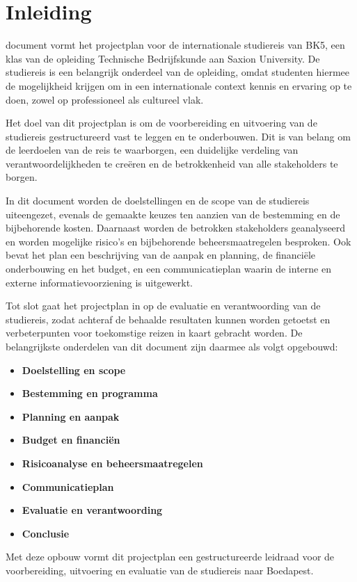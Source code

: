 \section{Inleiding}
 document vormt het projectplan voor de internationale studiereis van BK5, een klas van de opleiding Technische Bedrijfskunde aan Saxion University. De studiereis is een belangrijk onderdeel van de opleiding, omdat studenten hiermee de mogelijkheid krijgen om in een internationale context kennis en ervaring op te doen, zowel op professioneel als cultureel vlak.

\vspace{0.5cm}

Het doel van dit projectplan is om de voorbereiding en uitvoering van de studiereis gestructureerd vast te leggen en te onderbouwen. Dit is van belang om de leerdoelen van de reis te waarborgen, een duidelijke verdeling van verantwoordelijkheden te creëren en de betrokkenheid van alle stakeholders te borgen.

\vspace{0.5cm}

In dit document worden de doelstellingen en de scope van de studiereis uiteengezet, evenals de gemaakte keuzes ten aanzien van de bestemming en de bijbehorende kosten. Daarnaast worden de betrokken stakeholders geanalyseerd en worden mogelijke risico’s en bijbehorende beheersmaatregelen besproken. Ook bevat het plan een beschrijving van de aanpak en planning, de financiële onderbouwing en het budget, en een communicatieplan waarin de interne en externe informatievoorziening is uitgewerkt.

\vspace{0.5cm}

Tot slot gaat het projectplan in op de evaluatie en verantwoording van de studiereis, zodat achteraf de behaalde resultaten kunnen worden getoetst en verbeterpunten voor toekomstige reizen in kaart gebracht worden. De belangrijkste onderdelen van dit document zijn daarmee als volgt opgebouwd:

\vspace{0.5cm}

\begin{itemize}
	\item \textbf{Doelstelling en scope}
	\item \textbf{Bestemming en programma}
	\item \textbf{Planning en aanpak}
	\item \textbf{Budget en financiën}
	\item \textbf{Risicoanalyse en beheersmaatregelen}
	\item \textbf{Communicatieplan}
	\item \textbf{Evaluatie en verantwoording}
	\item \textbf{Conclusie}
\end{itemize}

\vspace{0.5cm}

Met deze opbouw vormt dit projectplan een gestructureerde leidraad voor de voorbereiding, uitvoering en evaluatie van de studiereis naar Boedapest.